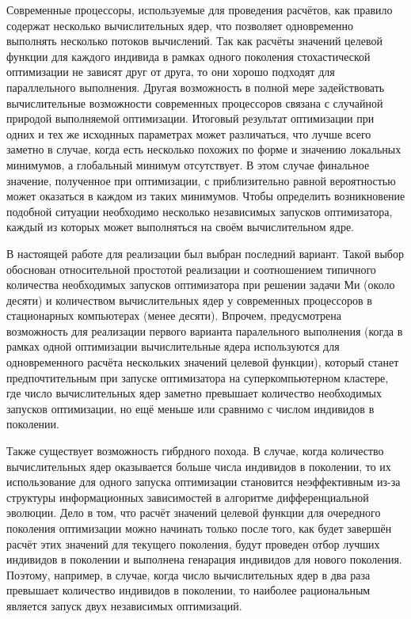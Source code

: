 Современные процессоры, используемые для проведения расчётов, как
правило содержат несколько вычислительных ядер, что позволяет
одновременно выполнять несколько потоков вычислений. Так как расчёты
значений целевой функции для каждого индивида в рамках одного
поколения стохастической оптимизации не зависят друг от друга, то они
хорошо подходят для параллельного выполнения. Другая возможность в
полной мере задействовать вычислительные возможности современных
процессоров связана с случайной природой выполняемой
оптимизации. Итоговый результат оптимизации при одних и тех же
исходнных параметрах может различаться, что лучше всего заметно в
случае, когда есть несколько похожих по форме и значению локальных
минимумов, а глобальный минимум отсутствует. В этом случае финальное
значение, полученное при оптимизации, с приблизительно равной
вероятностью может оказаться в каждом из таких минимумов. Чтобы
определить возникновение подобной ситуации необходимо несколько
независимых запусков оптимизатора, каждый из которых может выполняться
на своём вычислительном ядре.

В настоящей работе для реализации был выбран последний вариант. Такой
выбор обоснован относительной простотой реализации и соотношением
типичного количества необходимых запусков оптимизатора при решении
задачи Ми (около десяти) и количеством вычислительных ядер у
современных процессоров в стационарных компьютерах (менее
десяти). Впрочем, предусмотрена возможность для реализации первого
варианта паралельного выполнения (когда в рамках одной оптимизации
вычислительные ядера используются для одновременного расчёта
нескольких значений целевой функции), который станет предпочтительным
при запуске оптимизатора на суперкомпьютерном кластере, где число
вычислительных ядер заметно превышает количество необходимых запусков
оптимизации, но ещё меньше или сравнимо с числом индивидов в поколении.

Также существует возможность гибрдного похода. В случае, когда
количество вычислительных ядер оказывается больше числа индивидов в
поколении, то их использование для одного запуска оптимизации
становится неэффективным из-за структуры информационных зависимостей в
алгоритме дифференциальной эволюции. Дело в том, что расчёт значений
целевой функции для очередного поколения оптимизации можно начинать
только после того, как будет завершён расчёт этих значений для
текущего поколения, будут проведен отбор лучших индивидов в поколении
и выполнена генарация индивидов для нового поколения. Поэтому,
например, в случае, когда число вычислительных ядер в два раза
превышает количество индивидов в поколении, то наиболее рациональным
является запуск двух независимых оптимизаций.

